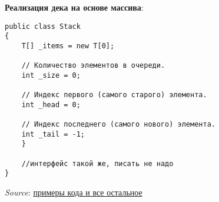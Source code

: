 \noindent\textbf{Реализация дека на основе массива}:
\begin{verbatim}
public class Stack
{
    T[] _items = new T[0];

    // Количество элементов в очереди.
    int _size = 0;

    // Индекс первого (самого старого) элемента.
    int _head = 0;

    // Индекс последнего (самого нового) элемента.
    int _tail = -1;
    }

	//интерфейс такой же, писать не надо
}
\end{verbatim}

\noindent\textit{Source}: \href{https://tproger.ru/translations/stacks-and-queues-for-beginners/amp/}{примеры кода и все остальное}